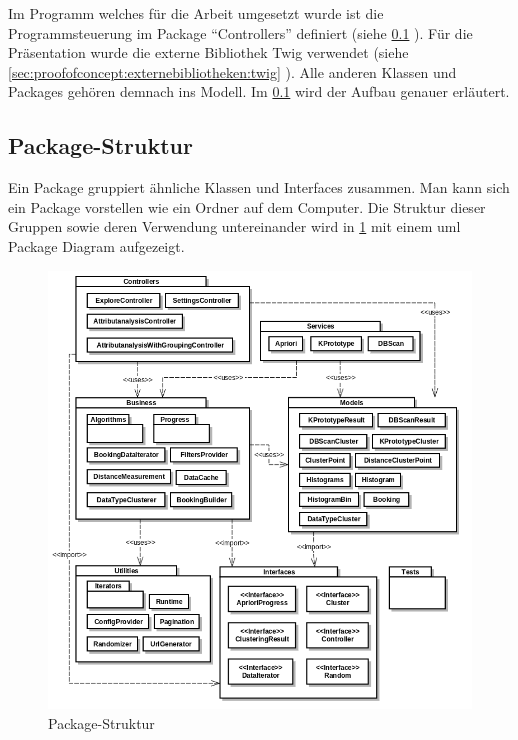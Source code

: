 Im Programm welches für die Arbeit umgesetzt wurde ist die Programmsteuerung im Package "`Controllers"' definiert (siehe \cref{sec:proofofconcept:packagestruktur} ). Für die Präsentation wurde die externe Bibliothek Twig verwendet (siehe \cref{sec:proofofconcept:externebibliotheken:twig} ). Alle anderen Klassen und Packages gehören demnach ins Modell. Im \cref{sec:proofofconcept:packagestruktur} wird der Aufbau genauer erläutert.

\subsection{Package-Struktur}
\label{sec:proofofconcept:packagestruktur}
Ein Package gruppiert ähnliche Klassen und Interfaces zusammen. Man kann sich ein Package vorstellen wie ein Ordner auf dem Computer. Die Struktur dieser Gruppen sowie deren Verwendung untereinander wird in \cref{fig:proofofconcept:packagestruktur:1} mit einem \gls{uml} Package Diagram aufgezeigt.
\begin{figure}[H]
	\RawFloats
	\centering
	\includegraphics[width=1\textwidth]{images/diagram-package-diagram}
	\caption{Package-Struktur}
	\label{fig:proofofconcept:packagestruktur:1}
\end{figure}

